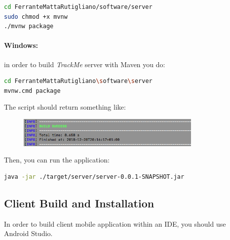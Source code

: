 \documentclass[a4paper]{article}
\begin{document}
\begin{lstlisting}[language=bash]
cd FerranteMattaRutigliano/software/server
sudo chmod +x mvnw
./mvnw package
\end{lstlisting}

\paragraph{Windows:} in order to build \textit{TrackMe} server with Maven you do:

\begin{lstlisting}[language=bash]
cd FerranteMattaRutigliano\software\server
mvnw.cmd package
\end{lstlisting}

\newpage
The script should return something like:
\begin{figure}[!htpb]
    \centering
    \includegraphics[width=0.8\textwidth, keepaspectratio]{ITD/images/maven.png}
\end{figure}

Then, you can run the application:

\begin{lstlisting}[language=bash]
java -jar ./target/server/server-0.0.1-SNAPSHOT.jar
\end{lstlisting}

\newpage
\subsection{Client Build and Installation}
In order to build client mobile application within an IDE, you should use Android Studio.
\end{document}

